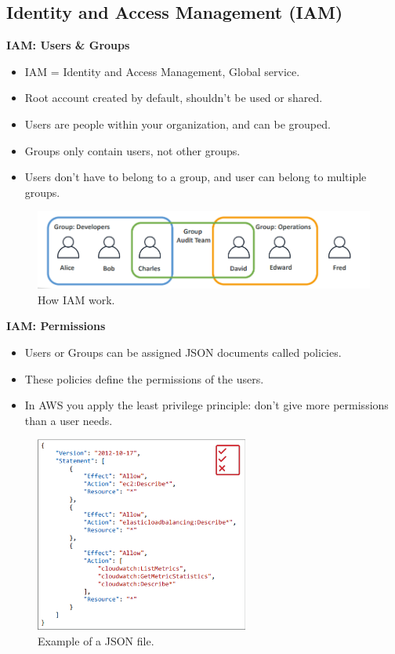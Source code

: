 \documentclass{article}
\begin{document}
\subsection{Identity and Access Management (IAM)}
\textbf{IAM: Users \& Groups}\par
\begin{itemize}
    \item IAM = Identity and Access Management, Global service.
    \item Root account created by default, shouldn’t be used or shared.
    \item Users are people within your organization, and can be grouped.
    \item Groups only contain users, not other groups.
    \item Users don’t have to belong to a group, and user can belong to multiple groups.
\end{itemize}
\begin{figure}[h]
    \centering
    \includegraphics[width = 13cm]{Pictures/Theory/IAM_Define.png}
    \caption{How IAM work.}
    \label{fig:enter-label}
\end{figure}

\textbf{IAM: Permissions}\par
\begin{itemize}
    \item Users or Groups can be assigned JSON documents called policies.
    \item These policies define the permissions of the users.
    \item In AWS you apply the least privilege principle: don’t give more permissions than a user needs.
\end{itemize}
\begin{figure}[h]
    \centering
    \includegraphics[width = 7cm]{Pictures/Theory/IAM_JSON.png}
    \caption{Example of a JSON file.}
    \label{fig:enter-label}
\end{figure}
\end{document}

